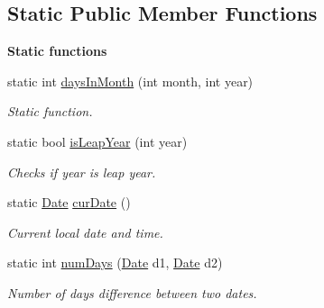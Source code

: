 \subsection*{Static Public Member Functions}
\begin{Indent}{\bf Static functions}\par
\begin{DoxyCompactItemize}
\item 
static int \hyperlink{class_date_ab59a4fe6057aabe5caa8d53dc03e2a3a}{days\+In\+Month} (int month, int year)
\begin{DoxyCompactList}\small\item\em Static function. \end{DoxyCompactList}\item 
static bool \hyperlink{class_date_a6fc6234821bfcd26f77b4510e116d611}{is\+Leap\+Year} (int year)
\begin{DoxyCompactList}\small\item\em Checks if year is leap year. \end{DoxyCompactList}\item 
static \hyperlink{class_date}{Date} \hyperlink{class_date_a56bfc49258eebcf21a410633e1e84e29}{cur\+Date} ()
\begin{DoxyCompactList}\small\item\em Current local date and time. \end{DoxyCompactList}\item 
static int \hyperlink{class_date_a6c59bb1b4c2f47710712563a5c05aa51}{num\+Days} (\hyperlink{class_date}{Date} d1, \hyperlink{class_date}{Date} d2)
\begin{DoxyCompactList}\small\item\em Number of days difference between two dates. \end{DoxyCompactList}\end{DoxyCompactItemize}
\end{Indent}
